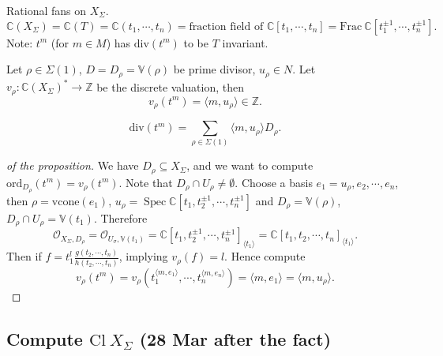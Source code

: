 \documentclass[a4paper,12pt]{amsart}
\newcommand{\ZZ}{\mathbb{Z}}
\newcommand{\CC}{\mathbb{C}}
\DeclareMathOperator{\Spec}{Spec}
\begin{document}
Rational fans on $X_\Sigma$.
\begin{displaymath}
\CC(X_\Sigma)=\CC(T)=\CC(t_1,\cdots,t_n)=\text{fraction field of }\CC[t_1,\cdots,t_n]=\mathrm{Frac}~\CC[t_1^{\pm1},\cdots,t_n^{\pm1}].
\end{displaymath}
Note: $t^m$ (for $m\in M$) has $\mathrm{div}(t^m)$ to be $T$ invariant.

\begin{proposition}
	Let $\rho\in\Sigma(1)$, $D=D_\rho=\mathbb{V}(\rho)$ be prime divisor, $u_\rho\in N$. Let $v_\rho:\CC(X_\Sigma)^*\to\ZZ$ be the discrete valuation, then
	\begin{displaymath}
	v_\rho(t^m)=\langle m,u_\rho\rangle\in\ZZ.
	\end{displaymath}
\end{proposition}

\begin{corollary}
	\begin{displaymath}
	\mathrm{div}(t^m)=\sum_{\rho\in\Sigma(1)}\langle m,u_\rho\rangle D_\rho.
	\end{displaymath}
\end{corollary}

\begin{proof}[of the proposition]
	We have $D_\rho\subseteq X_\Sigma$, and we want to compute $\mathrm{ord}_{D_\rho}(t^m)=v_\rho(t^m)$. Note that $D_\rho\cap U_\rho\neq\emptyset$. Choose a basis $e_1=u_\rho,e_2,\cdots,e_n$, then $\rho=\mathrm{vcone}(e_1)$, $u_\rho=\Spec\CC[t_1,t_2^{\pm1},\cdots,t_n^{\pm1}]$ and $D_\rho=\mathbb{V}(\rho)$, $D_\rho\cap U_\rho=\mathbb{V}(t_1)$. Therefore
	\begin{displaymath}
	\mathscr{O}_{X_\Sigma,D_\rho}=\mathscr{O}_{U_\sigma,\mathbb{V}(t_1)}=\CC[t_1,t_2^{\pm1},\cdots,t_n^{\pm1}]_{\langle t_1\rangle}=\CC[t_1,t_2,\cdots,t_n]_{\langle t_1\rangle}.
	\end{displaymath}
	Then if  $f=t_1^l\frac{g(t_2,\cdots,t_n)}{h(t_2,\cdots,t_n)}$, implying $v_\rho(f)=l$. Hence compute
	\begin{displaymath}
	v_\rho(t^m)=v_\rho(t_1^{\langle m,e_1\rangle},\cdots,t_n^{\langle m,e_n\rangle})=\langle m,e_1\rangle=\langle m,u_\rho\rangle.
	\end{displaymath}
\end{proof}

\subsection{Compute $\mathrm{Cl}~X_\Sigma$ (28 Mar after the fact)}
\end{document}
